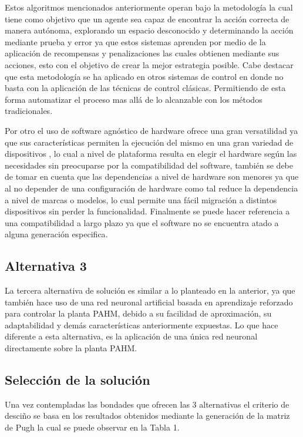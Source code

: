 \documentclass[12pt]{article}
\begin{document}
Estos algoritmos mencionados anteriormente operan bajo la metodología la cual tiene como objetivo que un agente sea capaz de encontrar la acción correcta de manera autónoma, explorando un espacio desconocido y determinando la acción mediante prueba y error ya que estos sistemas aprenden por medio de la aplicación de recompensas y penalizaciones las cuales obtienen mediante sus acciones, esto con el objetivo de crear la mejor estrategia posible. Cabe destacar que esta metodología se ha aplicado en otros sistemas de control en donde no basta con la aplicación de las técnicas de control clásicas. Permitiendo de esta forma automatizar el proceso mas allá de lo alcanzable con los métodos tradicionales\cite{naizhang2022intel}. 

Por otro el uso de software agnóstico de hardware ofrece una gran versatilidad ya que sus características permiten la ejecución del mismo en una gran variedad de dispositivos , lo cual a nivel de plataforma resulta en elegir el hardware según las necesidades sin preocuparse por la compatibilidad del software, también se debe de tomar en cuenta que las dependencias a nivel de hardware son menores ya que al no depender de una configuración de hardware como tal reduce la dependencia a nivel de marcas o modelos, lo cual permite una fácil migración a distintos dispositivos sin perder la funcionalidad. Finalmente se puede hacer referencia a una compatibilidad a largo plazo ya que el software no se encuentra atado a alguna generación especifica\cite{krainiuk2021oneapi}. 


\subsection{Alternativa 3}

La tercera alternativa de solución es similar a lo planteado en la anterior, ya que también hace uso de una red neuronal artificial basada en aprendizaje reforzado para controlar la planta PAHM, debido a su facilidad de aproximación, su adaptabilidad y demás características anteriormente expuestas. Lo que hace diferente a esta alternativa, es la aplicación de una única red neuronal directamente sobre la planta PAHM\cite{15-tec}.

\subsection{Selección de la solución}

Una vez contempladas las bondades que ofrecen las 3 alternativas el criterio de desciño se basa en los resultados obtenidos mediante la generación de la matriz de Pugh la cual se puede observar en la Tabla 1.
\end{document}
